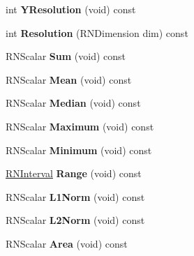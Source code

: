 \begin{DoxyCompactItemize}
\item 
int {\bfseries Y\+Resolution} (void) const \hypertarget{class_r2_grid_a418d4643f2fe864977bbf1100ab8b222}{}\label{class_r2_grid_a418d4643f2fe864977bbf1100ab8b222}

\item 
int {\bfseries Resolution} (R\+N\+Dimension dim) const \hypertarget{class_r2_grid_a321ef5029f5943b50dc4d277bf52e048}{}\label{class_r2_grid_a321ef5029f5943b50dc4d277bf52e048}

\item 
R\+N\+Scalar {\bfseries Sum} (void) const \hypertarget{class_r2_grid_a064f527488e010c0417d06c0ea92bcc8}{}\label{class_r2_grid_a064f527488e010c0417d06c0ea92bcc8}

\item 
R\+N\+Scalar {\bfseries Mean} (void) const \hypertarget{class_r2_grid_a45676187266aa1ec496ae89e13023482}{}\label{class_r2_grid_a45676187266aa1ec496ae89e13023482}

\item 
R\+N\+Scalar {\bfseries Median} (void) const \hypertarget{class_r2_grid_ad7df5122bc174b5ae7ff6d369d6e3bf6}{}\label{class_r2_grid_ad7df5122bc174b5ae7ff6d369d6e3bf6}

\item 
R\+N\+Scalar {\bfseries Maximum} (void) const \hypertarget{class_r2_grid_aba84db6b270da0785849a66a12a9cd33}{}\label{class_r2_grid_aba84db6b270da0785849a66a12a9cd33}

\item 
R\+N\+Scalar {\bfseries Minimum} (void) const \hypertarget{class_r2_grid_a81c9da7c7e0cedb10f8631af224db03e}{}\label{class_r2_grid_a81c9da7c7e0cedb10f8631af224db03e}

\item 
\hyperlink{class_r_n_interval}{R\+N\+Interval} {\bfseries Range} (void) const \hypertarget{class_r2_grid_a3e22ebb96b5dbe51861f5251b9682235}{}\label{class_r2_grid_a3e22ebb96b5dbe51861f5251b9682235}

\item 
R\+N\+Scalar {\bfseries L1\+Norm} (void) const \hypertarget{class_r2_grid_a192085b37efc61ebce36904bb2a87f51}{}\label{class_r2_grid_a192085b37efc61ebce36904bb2a87f51}

\item 
R\+N\+Scalar {\bfseries L2\+Norm} (void) const \hypertarget{class_r2_grid_a19604d4cc59545c44b457947f10ab0fd}{}\label{class_r2_grid_a19604d4cc59545c44b457947f10ab0fd}

\item 
R\+N\+Scalar {\bfseries Area} (void) const \hypertarget{class_r2_grid_a2ac1dbaee0106cce7b63f3004d25f502}{}\label{class_r2_grid_a2ac1dbaee0106cce7b63f3004d25f502}


\end{DoxyCompactItemize}
